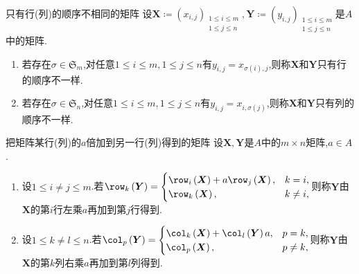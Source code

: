 \begin{definition}{只有行(列)的顺序不相同的矩阵}{}
	设$\boldsymbol{X}\coloneq\left(x_{i,j}\right)_{\substack{1\leq i\leq m\\1\leq j\leq n}},\boldsymbol{Y}\coloneq\left(y_{i,j}\right)_{\substack{1\leq i\leq m\\1\leq j\leq n}}$是$A$中的矩阵.
	\begin{enumerate}
		\item 若存在$\sigma\in\mathfrak{S}_{m}$,对任意$1\leq i\leq m,1\leq j\leq n$有$y_{i,j}=x_{\sigma\left(i\right),j}$,则称$\boldsymbol{X}$和$\boldsymbol{Y}$只有行的顺序不一样.
		\item 若存在$\sigma\in\mathfrak{S}_{n}$,对任意$1\leq i\leq m,1\leq j\leq n$有$y_{i,j}=x_{i,\sigma\left(j\right)}$,则称$\boldsymbol{X}$和$\boldsymbol{Y}$只有列的顺序不一样.
	\end{enumerate}
\end{definition}

\begin{definition}{把矩阵某行(列)的$a$倍加到另一行(列)得到的矩阵}{}
	设$\boldsymbol{X},\boldsymbol{Y}$是$A$中的$m\times n$矩阵,$a\in A$.
	\begin{enumerate}
		\item 设$1\leq i\neq j\leq m$.若$\row_{k}\left(\boldsymbol{Y}\right)=
		\begin{cases}
			\row_{i}\left(\boldsymbol{X}\right)+a\row_{j}\left(\boldsymbol{X}\right),&k=i,\\
			\row_{k}\left(\boldsymbol{X}\right),&k\neq i,
		\end{cases}
		$则称$\boldsymbol{Y}$由$\boldsymbol{X}$的第$i$行左乘$a$再加到第$j$行得到.
		\item 设$1\leq k\neq l\leq n$.若$\col_{p}\left(\boldsymbol{Y}\right)=
		\begin{cases}
			\col_{k}\left(\boldsymbol{X}\right)+\col_{l}\left(\boldsymbol{Y}\right)a,&p=k,\\
			\col_{p}\left(\boldsymbol{X}\right),&p\neq k,
		\end{cases}$则称$\boldsymbol{Y}$由$\boldsymbol{X}$的第$k$列右乘$a$再加到第$l$列得到.
	\end{enumerate}
\end{definition}


